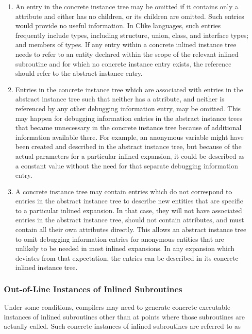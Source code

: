 \begin{enumerate}[1. ]
\item An entry in the concrete instance tree may be omitted if
it contains only a 
\DWATabstractorigin{} attribute and either
has no children, or its children are omitted. Such entries
would provide no useful information. In C\dash like languages,
such entries frequently include types, including structure,
union, class, and interface types; and members of types. If any
entry within a concrete inlined instance tree needs to refer
to an entity declared within the scope of the relevant inlined
subroutine and for which no concrete instance entry exists,
the reference should refer to the abstract instance entry.

\item Entries in the concrete instance tree which are associated
with entries in the abstract instance tree such that neither
has a \DWATname{} attribute,
and neither is referenced by
any other debugging information entry, may be omitted. This
may happen for debugging information entries in the abstract
instance trees that became unnecessary in the concrete instance
tree because of additional information available there. For
example, an anonymous variable might have been created and
described in the abstract instance tree, but because of
the actual parameters for a particular inlined expansion,
it could be described as a constant value without the need
for that separate debugging information entry.

\item A concrete instance tree may contain entries which do
not correspond to entries in the abstract instance tree
to describe new entities that are specific to a particular
inlined expansion. In that case, they will not have associated
entries in the abstract instance tree, should not contain
\DWATabstractorigin{} attributes, and must contain all their
own attributes directly. This allows an abstract instance tree
to omit debugging information entries for anonymous entities
that are unlikely to be needed in most inlined expansions. In
any expansion which deviates from that expectation, the
entries can be described in its concrete inlined instance tree.

\end{enumerate}

\subsubsection{Out-of-Line Instances of Inlined Subroutines}
\label{chap:outoflineinstancesofinlinedsubroutines}
Under some conditions, compilers may need to generate concrete
executable instances of inlined subroutines other than at
points where those subroutines are actually called. Such
concrete instances of inlined subroutines are referred to as

